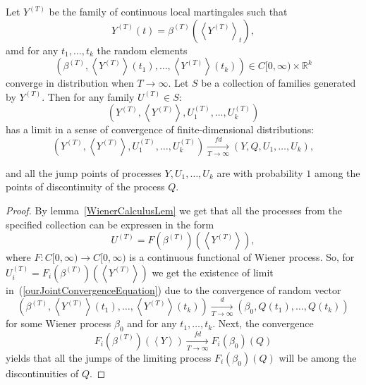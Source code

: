 \documentclass[12pt, a4paper, titlepage]{article}
\begin{document}
\begin{theorem}\label{YDefinedProcessesTheorem}
 Let $Y^{(T)}$ be the family of continuous local martingales such that
$$Y^{(T)}(t)=\beta^{(T)}\left(\left<Y^{(T)}\right>_t\right),$$
amd for any $t_1, \ldots, t_k$ the random elements
$$(\beta^{(T)}, \left<Y^{(T)}\right>(t_1), \ldots, \left<Y^{(T)}\right>(t_k)) 
\in C[0, \infty)\times \mathbb{R}^k$$
converge in distribution when $T \to \infty$. 
Let $S$ be a collection of families generated by $Y^{(T)}$.
Then for any family $U^{(T)}\in S$: 
$$(Y^{(T)}, \left<Y^{(T)}\right>, U_1^{(T)}, \ldots,  U_k^{(T)})$$
has a limit in a sense of convergence of finite-dimensional distributions: 
\begin{equation} \label{ourJointConvergenceEquation}
 \left(Y^{(T)}, \left<Y^{(T)}\right>,
U_1^{(T)}, \ldots,  U_k^{(T)}\right) \xrightarrow[T \to \infty]{fd}
\left(Y, Q, U_1, \ldots,  U_k\right),
\end{equation}

and all the jump points of processes $Y, U_1, \ldots, U_k$
are with probability $1$ among the points of discontinuity of the process $Q$. 
\end{theorem}
\begin{proof}
 By lemma~\ref{WienerCalculusLem} we get that all the processes from the specified
collection can be expressen in the form
$$U^{(T)}=F(\beta^{(T)})(\left<Y^{(T)}\right>),$$
where $F\colon C[0,\infty) \to C[0, \infty)$ is a continuous functional of 
Wiener process. So, for $U_i^{(T)}=F_i(\beta^{(T)})(\left<Y^{(T)}\right>)$
we get the existence of limit in~(\ref{ourJointConvergenceEquation}) due to the convergence of
random vector 
$$(\beta^{(T)}, \left<Y^{(T)}\right>(t_1), \ldots, \left<Y^{(T)}\right>(t_k))
\xrightarrow[T\to\infty]{d}(\beta_0, Q(t_1), \ldots, Q(t_k))$$
for some Wiener process $\beta_0$ and for any $t_1, \ldots, t_k$. Next, the convergence
$$F_i(\beta^{(T)})(\left<Y\right>)\xrightarrow[T\to\infty]{fd}
F_i(\beta_0)(Q)$$ yields that all the jumps of the limiting process
$F_i(\beta_0)(Q)$ will be among the discontinuities of $Q$. 
\end{proof}
\end{document}
